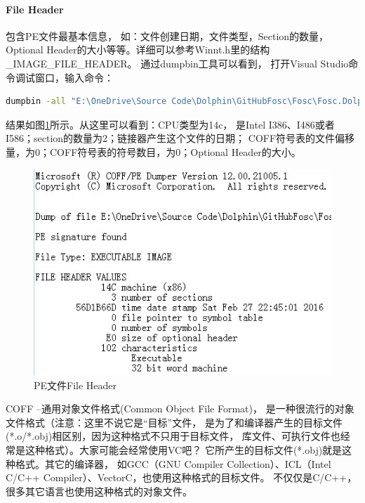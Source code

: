 \documentclass{book}
\begin{document}
\paragraph{File Header}包含PE文件最基本信息，
如：文件创建日期，文件类型，Section的数量，Optional Header的大小等等。详细可以参考Winnt.h里的结构\_IMAGE\_FILE\_HEADER。
通过dumpbin工具可以看到，
打开Visual Studio命令调试窗口，输入命令：

\begin{lstlisting}[language=Bash]
dumpbin -all "E:\OneDrive\Source Code\Dolphin\GitHubFosc\Fosc\Fosc.Dolphin.UI\Fosc.Dolphin.UI\bin\x64\Debug\Fosc.Dolphin.UI.exe" >>C:\dump.txt
\end{lstlisting}

结果如图\ref{fig:DumpbinToCheckPEHeader}所示。从这里可以看到：CPU类型为14c，
是Intel I386、I486或者I586；section的数量为2；链接器产生这个文件的日期；
COFF符号表的文件偏移量，为0；COFF符号表的符号数目，为0；Optional Header的大小。

\begin{figure}[htbp]
	\centering
	\includegraphics[scale=0.8]{DumpbinToCheckPEHeader.jpg}
	\caption{PE文件File Header}
	\label{fig:DumpbinToCheckPEHeader}
\end{figure}

COFF –通用对象文件格式(Common Object File Format)，
是一种很流行的对象文件格式（注意：这里不说它是“目标”文件，
是为了和编译器产生的目标文件(*.o/*.obj)相区别，因为这种格式不只用于目标文件，
库文件、可执行文件也经常是这种格式）。大家可能会经常使用VC吧？
它所产生的目标文件(*.obj)就是这种格式。其它的编译器，
如GCC（GNU Compiler Collection）、ICL（Intel C/C++ Compiler）、VectorC，也使用这种格式的目标文件。
不仅仅是C/C++，很多其它语言也使用这种格式的对象文件。
\end{document}
